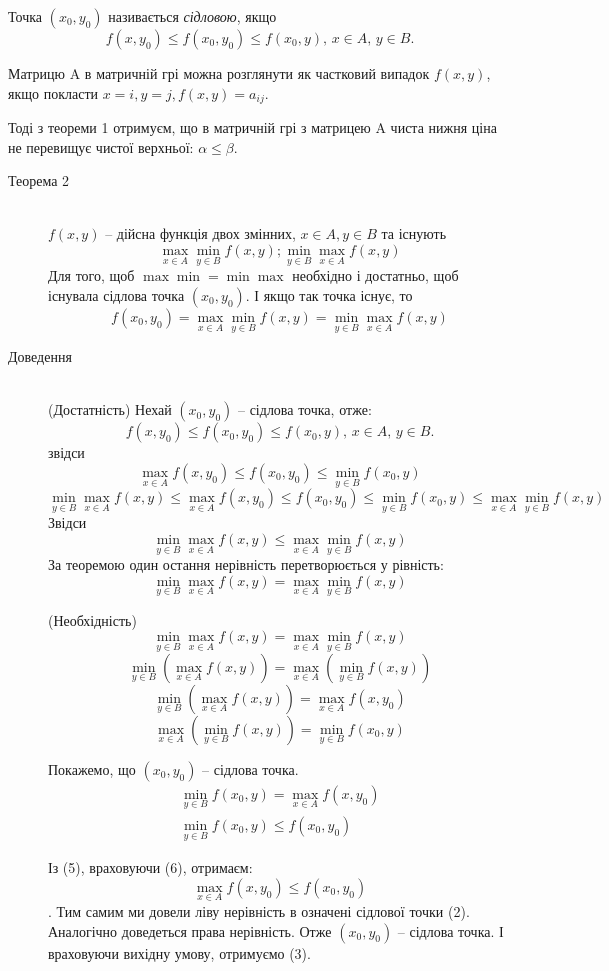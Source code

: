 \documentclass[12pt,a4paper]{report}
\begin{document}
Точка $(x_0, y_0)$ називається \emph{сідловою}, якщо
\begin{equation}
f(x, y_0) \le f(x_0, y_0) \le f(x_0, y),\, x \in A,\, y \in B.
\end{equation}

Матрицю A в матричній грі можна розглянути як частковий випадок $f(x, y)$, якщо покласти $x=i, y=j, f(x, y) = a_{ij}$.

Тоді з теореми 1 отримуєм, що в матричній грі з матрицею A чиста нижня ціна не перевищує чистої верхньої: $\alpha \le \beta$.

\begin{description}

\item[Теорема 2] \hfill \\
$f(x, y)$ -- дійсна функція двох змінних, $x \in A, y \in B$ та існують
\[
\max_{x \in A} \min_{y \in B}f(x, y); \min_{y \in B} \max_{x \in A}f(x, y)
\]
Для того, щоб $\max\min = \min\max$ необхідно і достатньо, щоб існувала сідлова точка $(x_0, y_0)$. І якщо так точка існує, то
\begin{equation}
f(x_0, y_0)=\max_{x \in A} \min_{y \in B}f(x, y) = \min_{y \in B} \max_{x \in A}f(x, y)
\end{equation}

\item[Доведення] \hfill \\
(Достатність) Нехай $(x_0, y_0)$ -- сідлова точка, отже:
\[
f(x, y_0) \le f(x_0, y_0) \le f(x_0, y),\, x \in A,\, y \in B.
\]
звідси
\begin{equation}
\max_{x \in A} f(x, y_0) \le f(x_0, y_0) \le \min_{y \in B} f(x_0, y)
\end{equation}
\[
\min_{y \in B} \max_{x \in A} f(x, y) \le \max_{x \in A} f(x, y_0) \le f(x_0, y_0) \le \min_{y \in B} f(x_0, y) \le \max_{x \in A}  \min_{y \in B} f(x, y)
\]
Звідси
\[
\min_{y \in B} \max_{x \in A} f(x, y)  \le \max_{x \in A}  \min_{y \in B} f(x, y)
\]
За теоремою один остання нерівність перетворюється у рівність:
\[
\min_{y \in B} \max_{x \in A} f(x, y)  = \max_{x \in A}  \min_{y \in B} f(x, y)
\]

(Необхідність) 
\[\min_{y \in B} \max_{x \in A} f(x, y)  = \max_{x \in A}  \min_{y \in B} f(x, y)\]
\[\min_{y \in B} \left(\max_{x \in A} f(x, y)\right)  = \max_{x \in A}  \left(\min_{y \in B} f(x, y)\right)\]
\[\min_{y \in B} \left(\max_{x \in A} f(x, y)\right)  = \max_{x \in A} f(x, y_0)\]
\[\max_{x \in A} \left(\min_{y \in B} f(x, y)\right)= \min_{y \in B} f(x_0, y)\]

Покажемо, що $(x_0, y_0)$ -- сідлова точка.
\begin{eqnarray}
\min_{y \in B} f(x_0, y)=\max_{x \in A} f(x, y_0)\\
\min_{y \in B} f(x_0, y) \le f(x_0, y_0)
\end{eqnarray}

Із (5), враховуючи (6), отримаєм:
\[\max_{x \in A} f(x, y_0) \le f(x_0, y_0) \]. Тим самим ми довели ліву нерівність в означені сідлової точки (2). Аналогічно доведеться права нерівність. Отже $(x_0, y_0)$ -- сідлова точка. І враховуючи вихідну умову, отримуємо (3).

\end{description}
\end{document}
